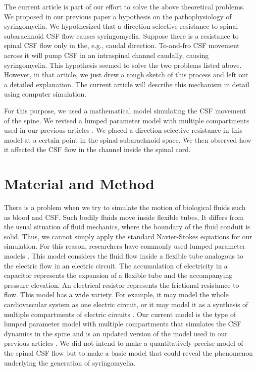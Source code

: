 \documentclass[fleqn,10pt]{wlscirep}
\begin{document}
The current article is part of our effort to solve the above theoretical
problems. We proposed in our previous paper \cite{chang2021hypothesis} a
hypothesis on the pathophysiology of syringomyelia. We hypothesized that a
direction-selective resistance to spinal subarachnoid CSF flow causes
syringomyelia. Suppose there is a resistance to spinal CSF flow only in
the, e.g., caudal direction. To-and-fro CSF movement across it will pump
CSF in an intraspinal channel caudally, causing syringomyelia. This
hypothesis seemed to solve the two problems listed above.  However, in that
article, we just drew a rough sketch of this process and left out a
detailed explanation. The current article will describe this mechanism in
detail using computer simulation.

For this purpose, we used a mathematical model simulating the CSF movement
of the spine. We revised a lumped parameter model with multiple
compartments used in our previous articles \cite{chang2003hypothesis,
chang2004theoretical}.  We placed a direction-selective resistance in this
model at a certain point in the spinal subarachnoid space. We then observed
how it affected the CSF flow in the channel inside the spinal cord.

\section*{Material and Method}

There is a problem when we try to simulate the motion of biological fluids
such as blood and CSF. Such bodily fluids move inside flexible tubes. It
differs from the usual situation of fluid mechanics, where the boundary of
the fluid conduit is solid. Thus, we cannot simply apply the standard
Navier-Stokes equations for our simulation. For this reason, researchers
have commonly used lumped parameter models \cite{shi2011review,
kokalari2013review}. This model considers the fluid flow inside a flexible
tube analogous to the electric flow in an electric circuit. The
accumulation of electricity in a capacitor represents the expansion of a
flexible tube and the accompanying pressure elevation. An electrical
resistor represents the frictional resistance to flow. This model has a
wide variety. For example, it may model the whole cardiovascular system as
one electric circuit, or it may model it as a synthesis of multiple
compartments of electric circuits \cite{shi2011review, kokalari2013review}.
Our current model is the type of lumped parameter model with multiple
compartments that simulates the CSF dynamics in the spine and is an updated
version of the model used in our previous articles
\cite{chang2003hypothesis, chang2004theoretical}.  We did not intend to
make a quantitatively precise model of the spinal CSF flow but to make a
basic model that could reveal the phenomenon underlying the generation of
syringomyelia. 
\end{document}
